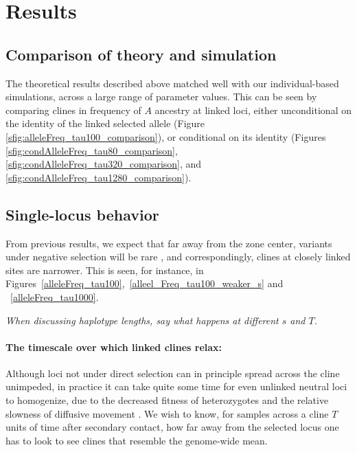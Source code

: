 \documentclass[11pt,letterpaper]{article}
\newcommand{\plr}[1]{{\em \color{blue} #1}}
\begin{document}
\section*{Results}

\subsection*{Comparison of theory and simulation}

The theoretical results described above matched well with our individual-based simulations,
across a large range of parameter values.
This can be seen by comparing
clines in frequency of $A$ ancestry at linked loci,
either unconditional on the identity of the linked selected allele (Figure \ref{sfig:alleleFreq_tau100_comparison}),
or conditional on its identity 
(Figures \ref{sfig:condAlleleFreq_tau80_comparison}, \ref{sfig:condAlleleFreq_tau320_comparison}, and \ref{sfig:condAlleleFreq_tau1280_comparison}).


\subsection*{Single-locus behavior}

From previous results, we expect that far away from the zone center, variants under negative selection will be rare \citep[for demonstration of this theoretical result, see e.g.][]{May1975,Slatkin1973,Barton??}, and correspondingly, clines at closely linked sites are narrower.
This is seen, for instance, in Figures~\ref{alleleFreq_tau100},~\ref{alleel_Freq_tau100_weaker_s} and ~\ref{alleleFreq_tau1000}. 

\plr{When discussing haplotype lengths, say what happens at different $s$ and $T$.}

\paragraph{The timescale over which linked clines relax:}
Although loci not under direct selection can in principle spread across the cline unimpeded,
in practice it can take quite some time for even unlinked neutral loci to homogenize,
due to the decreased fitness of heterozygotes \citep{Barton1986}
and the relative slowness of diffusive movement \citep{Sedghifar2015}.
We wish to know, for samples across a cline $T$ units of time after secondary contact, how far away from the selected locus one has to look to see clines that resemble the genome-wide mean.
\end{document}
